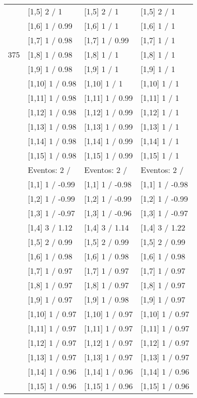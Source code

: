 \begin{table}
\begin{tabular}[t]{llll}
 & {}[1,5] 2  / 1 & {}[1,5] 2  / 1 & {}[1,5] 2  / 1\\
 & {}[1,6] 1  / 0.99 & {}[1,6] 1  / 1 & {}[1,6] 1  / 1\\
 & {}[1,7] 1  / 0.98 & {}[1,7] 1  / 0.99 & {}[1,7] 1  / 1\\
375 & {}[1,8] 1  / 0.98 & {}[1,8] 1  / 1 & {}[1,8] 1  / 1\\
\addlinespace
 & {}[1,9] 1  / 0.98 & {}[1,9] 1  / 1 & {}[1,9] 1  / 1\\
 & {}[1,10] 1  / 0.98 & {}[1,10] 1  / 1 & {}[1,10] 1  / 1\\
 & {}[1,11] 1  / 0.98 & {}[1,11] 1  / 0.99 & {}[1,11] 1  / 1\\
 & {}[1,12] 1  / 0.98 & {}[1,12] 1  / 0.99 & {}[1,12] 1  / 1\\
 & {}[1,13] 1  / 0.98 & {}[1,13] 1  / 0.99 & {}[1,13] 1  / 1\\
\addlinespace
 & {}[1,14] 1  / 0.98 & {}[1,14] 1  / 0.99 & {}[1,14] 1  / 1\\
 & {}[1,15] 1  / 0.98 & {}[1,15] 1  / 0.99 & {}[1,15] 1  / 1\\
 & Eventos:  2 / & Eventos:  2 / & Eventos:  2 /\\
 & {}[1,1] 1  / -0.99 & {}[1,1] 1  / -0.98 & {}[1,1] 1  / -0.98\\
 & {}[1,2] 1  / -0.99 & {}[1,2] 1  / -0.99 & {}[1,2] 1  / -0.99\\
\addlinespace
 & {}[1,3] 1  / -0.97 & {}[1,3] 1  / -0.96 & {}[1,3] 1  / -0.97\\
 & {}[1,4] 3  / 1.12 & {}[1,4] 3  / 1.14 & {}[1,4] 3  / 1.22\\
 & {}[1,5] 2  / 0.99 & {}[1,5] 2  / 0.99 & {}[1,5] 2  / 0.99\\
 & {}[1,6] 1  / 0.98 & {}[1,6] 1  / 0.98 & {}[1,6] 1  / 0.98\\
 & {}[1,7] 1  / 0.97 & {}[1,7] 1  / 0.97 & {}[1,7] 1  / 0.97\\
\addlinespace
500 & {}[1,8] 1  / 0.97 & {}[1,8] 1  / 0.97 & {}[1,8] 1  / 0.97\\
 & {}[1,9] 1  / 0.97 & {}[1,9] 1  / 0.98 & {}[1,9] 1  / 0.97\\
 & {}[1,10] 1  / 0.97 & {}[1,10] 1  / 0.97 & {}[1,10] 1  / 0.97\\
 & {}[1,11] 1  / 0.97 & {}[1,11] 1  / 0.97 & {}[1,11] 1  / 0.97\\
 & {}[1,12] 1  / 0.97 & {}[1,12] 1  / 0.97 & {}[1,12] 1  / 0.97\\
\addlinespace
 & {}[1,13] 1  / 0.97 & {}[1,13] 1  / 0.97 & {}[1,13] 1  / 0.97\\
 & {}[1,14] 1  / 0.96 & {}[1,14] 1  / 0.96 & {}[1,14] 1  / 0.96\\
 & {}[1,15] 1  / 0.96 & {}[1,15] 1  / 0.96 & {}[1,15] 1  / 0.96\\
\bottomrule
\end{tabular}
\end{table}
